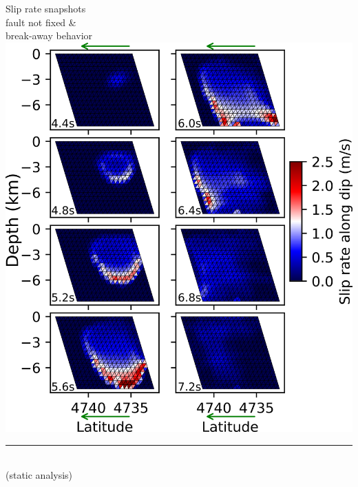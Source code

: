 \begin{poster}
{\begin{minipage}{0.667\linewidth}
\end{minipage} \vrule width 0.05cm
\begin{minipage}{0.32\linewidth}
\vskip 0.1cm
\centering Slip rate snapshots \\
fault not fixed \& \\ break-away behavior \\
\vskip 0.15cm
\centering \includegraphics[width=0.95\linewidth]{images/snaps_00080.png}
\vskip 0.45cm
\hrule height 0.05cm
\vskip 0.2cm
  \\
 (static analysis) \vskip 0.2cm

\end{minipage}}
\end{poster}
